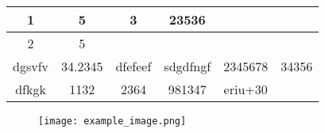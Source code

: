 \documentclass{article}
\begin{document}
\begin{tabular}{ |c|c|c|c|c|c| }
\hline
1 & 5 & 3 & 23536 &  &  \\
\hline
2 & 5 &  &  &  &  \\
\hline
dgsvfv & 34.2345 & dfefeef & sdgdfngf & 2345678 & 34356 \\
\hline
dfkgk & 1132 & 2364 & 981347 & eriu+30 &  \\
\hline
\end{tabular}
\begin{figure}[h]
\centering
\texttt{[image: example\_image.png]}
\end{figure}
\end{document}
